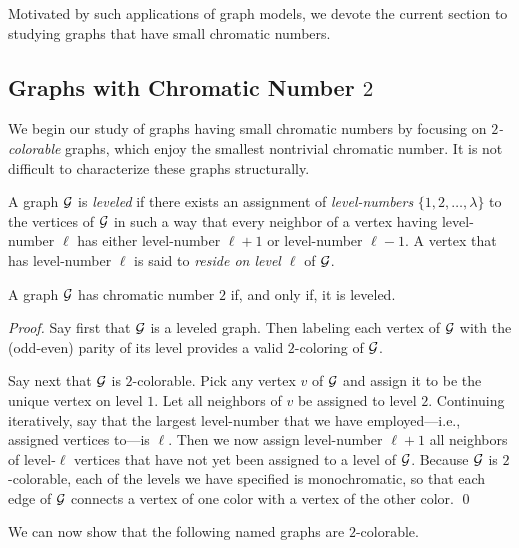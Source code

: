 \smallskip

Motivated by such applications of graph models, we devote the current section to studying graphs that have small chromatic numbers.

\subsection{Graphs with Chromatic Number $2$}
\label{sec:2-color-graphs}

We begin our study of graphs having small chromatic numbers by focusing on {\em $2$-colorable} graphs, which enjoy the smallest nontrivial chromatic number.  It is not difficult to characterize these graphs structurally.

\medskip

 
A graph $\mbox{$\cal G$}$ is {\it leveled} if there exists an assignment of {\it level-numbers} $\{ 1, 2, \ldots, \lambda\}$ to the vertices of $\mbox{$\cal G$}$ in such a way that every neighbor of a vertex having level-number $\ell$ has either level-number $\ell +1$ or level-number $\ell -1$.  A vertex that has level-number $\ell$ is said to {\it reside on level $\ell$} of $\mbox{$\cal G$}$.

\begin{prop}
\label{thm:leveled=2-color}
A graph $\mbox{$\cal G$}$ has chromatic number $2$ if, and only if, it is leveled.
\end{prop}

\begin{proof}
Say first that $\mbox{$\cal G$}$ is a leveled graph.  Then labeling each vertex of $\mbox{$\cal G$}$ with the (odd-even) parity of its level provides a valid $2$-coloring of $\mbox{$\cal G$}$.

\smallskip

Say next that $\mbox{$\cal G$}$ is $2$-colorable.  Pick any vertex $v$ of $\mbox{$\cal G$}$ and assign it to be the unique vertex on level $1$.  Let all neighbors of $v$ be assigned to level $2$.  Continuing iteratively, say that the largest level-number that we have employed---i.e., assigned vertices to---is $\ell$.  Then we now assign level-number $\ell +1$ all neighbors of level-$\ell$ vertices that have not yet been assigned to a level of $\mbox{$\cal G$}$.  Because $\mbox{$\cal G$}$ is $2$-colorable, each of the levels we have specified is monochromatic, so that each edge of $\mbox{$\cal G$}$ connects a vertex of one color with a vertex of the other color.  \qed
\end{proof}

We can now show that the following named graphs are $2$-colorable.

